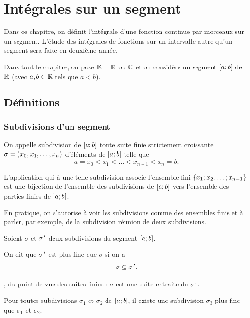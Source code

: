 \chapter{Intégrales sur un segment}

\minitoc

Dans ce chapitre, on définit l'intégrale d'une fonction continue par morceaux sur un segment. L'étude des intégrales de fonctions sur un intervalle autre qu'un segment sera faite en deuxième année.

Dans tout le chapitre, on pose \(\mathbb{K}=\mathbb{R}\) ou \(\mathbb{C}\) et on considère un segment \(\left[a;b\right]\) de \(\mathbb{R}\) (avec \(a,b\in\mathbb{R}\) tels que \(a<b\)).

\section{Définitions}

\subsection{Subdivisions d'un segment}

\begin{defi}
On appelle subdivision de \(\left[a;b\right]\) toute suite finie strictement croissante \(\sigma=\left(x_0,x_1,\dots,x_n\right)\) d'éléments de \(\left[a;b\right]\) telle que \[a=x_0<x_1<\dots<x_{n-1}<x_n=b.\]

L'application qui à une telle subdivision associe l'ensemble fini \(\left\lbrace x_1;x_2;\dots;x_{n-1}\right\rbrace\) est une bijection de l'ensemble des subdivisions de \(\left[a;b\right]\) vers l'ensemble des parties finies de \(\left]a;b\right[\).

En pratique, on s'autorise à voir les subdivisions comme des ensembles finis et à parler, par exemple, de la subdivision réunion de deux subdivisions.
\end{defi}

\begin{defi}
Soient \(\sigma\) et \(\sigma^{\,\prime}\) deux subdivisions du segment \(\left[a;b\right]\).

On dit que \(\sigma^{\,\prime}\) est plus fine que \(\sigma\) si on a \[\sigma\subseteq\sigma^{\,\prime}.\]

\Cad\!\!, du point de vue des suites finies : \(\sigma\) est une suite extraite de \(\sigma^{\,\prime}\).
\end{defi}

\begin{rem}
Pour toutes subdivisions \(\sigma_1\) et \(\sigma_2\) de \(\left[a;b\right]\), il existe une subdivision \(\sigma_3\) plus fine que \(\sigma_1\) et \(\sigma_2\).
\end{rem}

